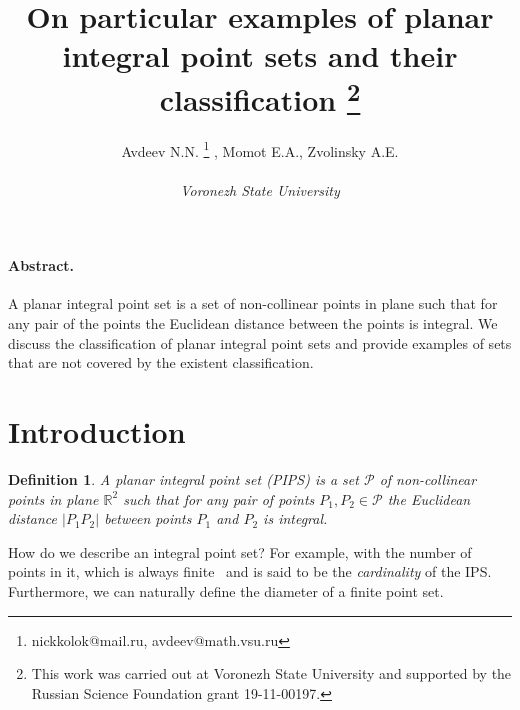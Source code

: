\documentclass[12pt]{article}
\theoremstyle{theorem}
\theoremstyle{dfn}
\newtheorem{dfn}{Definition}
\theoremstyle{remark}
\begin{document}






\title{
	On particular examples of planar integral point sets and their classification
	\footnote{
		This work was carried out at Voronezh State University and supported by the Russian Science
		Foundation grant 19-11-00197.
	}
}

\author{
	Avdeev N.N.
	\footnote{nickkolok@mail.ru, avdeev@math.vsu.ru}
	, Momot E.A., Zvolinsky A.E.
	\\
	\\
	\emph{Voronezh State University}
}

\maketitle

\paragraph{Abstract.}
	A planar integral point set is a set of non-collinear points in plane
	such that for any pair of the  points the Euclidean distance
	between the points is integral.
	We discuss the classification of planar integral point sets
	and provide examples of sets that are not covered by the existent classification.


\section{Introduction}



\begin{dfn}\label{dfn1}
	A planar integral point set (PIPS) is a set $\mathcal{P}$
	of non-collinear points in plane $\mathbb{R}^{2}$ such that
	for any pair of points $P_{1}, P_{2} \in \mathcal{P}$
	the Euclidean distance $|P_{1}P_{2}|$
	between points $P_{1}$ and $P_{2}$ is integral.
\end{dfn}

How do we describe an integral point set?
For example, with the number of points in it, which is always finite~\cite{anning1945integral,erdos1945integral}
and is said to be the \emph{cardinality} of the IPS.
Furthermore, we can naturally %
define the diameter of a finite point set.
\end{document}
